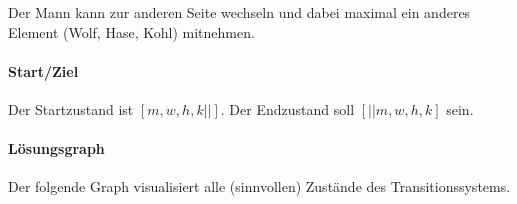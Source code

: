 \documentclass[12pt]{scrreprt}
\begin{document}
                    Der Mann kann zur anderen Seite wechseln und dabei maximal ein anderes Element (Wolf, Hase, Kohl) mitnehmen.


                \paragraph{Start/Ziel}

                    Der Startzustand ist $ [m, w, h, k \vert\vert] $. Der Endzustand soll $ [\vert\vert m, w, h, k] $ sein.


                \paragraph{Lösungsgraph}

                    Der folgende Graph visualisiert alle (sinnvollen) Zustände des Transitionssystems.
\end{document}
